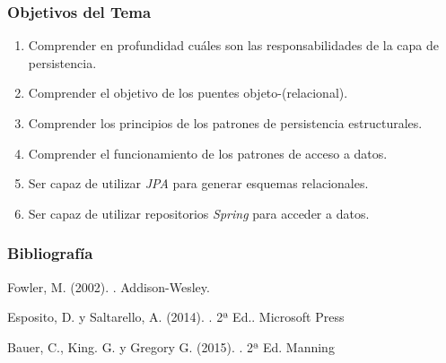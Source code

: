 \documentclass[a4paper,slidestop,xcolor=pst,blue]{beamer}
\begin{document}
\begin{frame}[c]
    \frametitle{Objetivos del Tema}
    \begin{enumerate}[<+->]
         \item Comprender en profundidad cuáles son las responsabilidades de la capa de persistencia.
         \item Comprender el objetivo de los puentes objeto-(relacional).
         \item Comprender los principios de los patrones de persistencia estructurales.
         \item Comprender el funcionamiento de los patrones de acceso a datos.
         \item Ser capaz de utilizar \emph{JPA} para generar esquemas relacionales.
         \item Ser capaz de utilizar repositorios \emph{Spring} para acceder a datos.
    \end{enumerate}
\end{frame}

\begin{frame}[c]
    \frametitle{Bibliografía}
    \begin{thebibliography}{1}

        Fowler, M. (2002).
        .
        \newblock Addison-Wesley.

        Esposito, D. y Saltarello, A. (2014).
        . 2ª Ed..
        \newblock Microsoft Press

        Bauer, C., King. G. y Gregory G. (2015).
        . 2ª Ed.
        \newblock Manning


    \end{thebibliography}
\end{frame}

\end{document}
